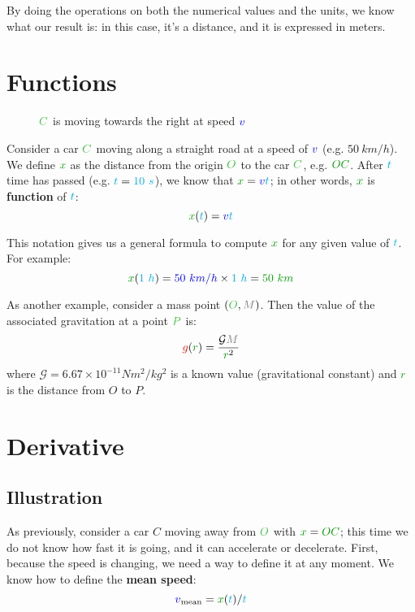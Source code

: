 By doing the operations on both the numerical values and the units,
we know what our result is: in this case, it's a distance, and it is
expressed in meters.



\section{Functions}

\begin{figure}[H]
\centering
{}
\caption{$\posit{C}$ is moving towards the right at speed $\textcolor{blue}{v}$}
\end{figure}

Consider a car $\posit{C}$ moving along a straight road at a speed of
$\textcolor{blue}{v}$ (e.g. $50~km/h$). We define $\dist{x}$ as the distance from
the origin $\posit{O}$ to the car $\posit{C}$, e.g. $\dist{OC}$. After
$\textcolor{cyan}{t}$ time has passed (e.g. $\textcolor{cyan}{t} = \textcolor{cyan}{10~s}$), we know
that $\dist{x} = \speed{v} \delay{t}$; in other words, $\dist{x}$ is
\textbf{function} of $\textcolor{cyan}{t}$:
\[
\dist{x}(\delay{t}) = \speed{v} \delay{t}
\]

This notation gives us a general formula to compute $\dist{x}$ for any
given value of $\textcolor{cyan}{t}$. For example:
\[
\dist{x}(\delay{1~h})
= \speed{50~km/h} \times \delay{1~h}
= \dist{50~km}
\]

As another example, consider a mass point $(\posit{O}, \mass{M})$. Then
the value of the associated gravitation at a point $\posit{P}$ is:
\[
\accel{g}(\dist{r}) = \frac {\mathcal G \mass{M}} {\dist{r}^2}
\]
where $\mathcal G = 6.67 \times 10^{-11} N m^2/kg^2$ is a known value
(gravitational constant) and $\dist{r}$ is the distance from $O$ to $P$.



\section{Derivative}


\subsection{Illustration}

As previously, consider a car $C$ moving away from $\posit{O}$ with
$\dist{x} = \dist{OC}$; this time we do not know how fast it is going, and
it can accelerate or decelerate. First, because the speed is changing,
we need a way to define it at any moment. We know how to define the
\textbf{mean speed}:
\[
\speed{v}_{\mathrm{mean}} = \dist{x}(\delay{t}) / \delay{t}
\]

